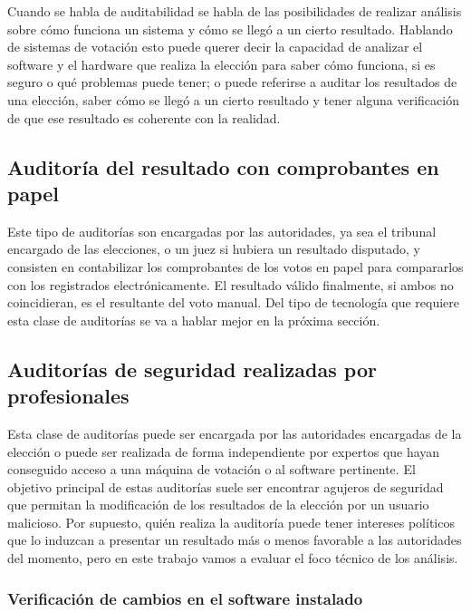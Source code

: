 Cuando se habla de auditabilidad se habla de las posibilidades de realizar análisis sobre cómo funciona un sistema y cómo se llegó a un cierto resultado. Hablando de sistemas de votación esto puede querer decir la capacidad de analizar el software y el hardware que realiza la elección para saber cómo funciona, si es seguro o qué problemas puede tener; o puede referirse a auditar los resultados de una elección, saber cómo se llegó a un cierto resultado y tener alguna verificación de que ese resultado es coherente con la realidad.

\subsection{Auditoría del resultado con comprobantes en papel}

Este tipo de auditorías son encargadas por las autoridades, ya sea el tribunal encargado de las elecciones, o un juez si hubiera un resultado disputado, y consisten en contabilizar los comprobantes de los votos en papel para compararlos con los registrados electrónicamente\cite{postElection}. El resultado válido finalmente, si ambos no coincidieran, es el resultante del voto manual. Del tipo de tecnología que requiere esta clase de auditorías se va a hablar mejor en la próxima sección.

\subsection{Auditorías de seguridad realizadas por profesionales}

Esta clase de auditorías puede ser encargada por las autoridades encargadas de la elección o puede ser realizada de forma independiente por expertos que hayan conseguido acceso a una máquina de votación o al software pertinente. El objetivo principal de estas auditorías suele ser encontrar agujeros de seguridad que permitan la modificación de los resultados de la elección por un usuario malicioso. Por supuesto, quién realiza la auditoría puede tener intereses políticos que lo induzcan a presentar un resultado más o menos favorable a las autoridades del momento, pero en este trabajo vamos a evaluar el foco técnico de los análisis.

\subsubsection{Verificación de cambios en el software instalado}

